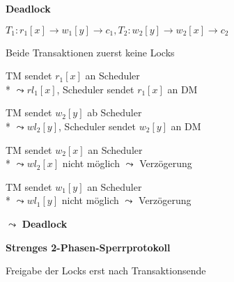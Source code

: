 \textbf{Deadlock}
\begin{items}
	\item \( T_1: r_1[x] \to w_1[y] \to c_1, T_2: w_2[y] \to w_2[x] \to c_2 \)
	\begin{enumeration}
		\item Beide Transaktionen zuerst keine Locks
		\item TM sendet \( r_1[x] \) an Scheduler
			\\*
			\( \leadsto rl_1[x] \), Scheduler sendet \( r_1[x] \) an DM
		\item TM sendet \( w_2[y] \) ab Scheduler
			\\*
			\( \leadsto wl_2[y] \), Scheduler sendet \( w_2[y] \) an DM
		\item TM sendet \( w_2[x] \) an Scheduler
			\\*
			\( \leadsto wl_2[x] \) nicht möglich \( \leadsto \) Verzögerung
		\item TM sendet \( w_1[y] \) an Scheduler
			\\*
			\( \leadsto wl_1[y] \) nicht möglich \( \leadsto \) Verzögerung
	\end{enumeration}
	\( \leadsto \) \textbf{Deadlock}
\end{items}

\textbf{Strenges 2-Phasen-Sperrprotokoll}
\begin{items}
	\item Freigabe der Locks erst nach Transaktionsende
\end{items}

